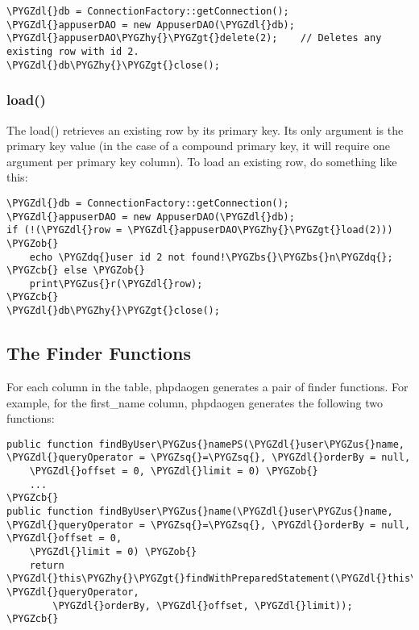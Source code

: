 \documentclass[letterpaper,10pt,english]{sphinxmanual}
\def\PYGZbs{\char`\\}
\def\PYGZus{\char`\_}
\def\PYGZob{\char`\{}
\def\PYGZcb{\char`\}}
\def\PYGZgt{\char`\>}
\def\PYGZdl{\char`\$}
\def\PYGZhy{\char`\-}
\def\PYGZsq{\char`\'}
\def\PYGZdq{\char`\"}
\renewcommand\PYGZsq{\textquotesingle}
\begin{document}
\begin{Verbatim}[commandchars=\\\{\}]
\PYGZdl{}db = ConnectionFactory::getConnection();
\PYGZdl{}appuserDAO = new AppuserDAO(\PYGZdl{}db);
\PYGZdl{}appuserDAO\PYGZhy{}\PYGZgt{}delete(2);    // Deletes any existing row with id 2.
\PYGZdl{}db\PYGZhy{}\PYGZgt{}close();
\end{Verbatim}


\subsubsection{load()}
\label{jaxFrameworkGuide:load}
The load() retrieves an existing row by its primary key.  Its only argument is the primary key value
(in the case of a compound primary key, it will require one argument per primary key column).
To load an existing row, do something like this:

\begin{Verbatim}[commandchars=\\\{\}]
\PYGZdl{}db = ConnectionFactory::getConnection();
\PYGZdl{}appuserDAO = new AppuserDAO(\PYGZdl{}db);
if (!(\PYGZdl{}row = \PYGZdl{}appuserDAO\PYGZhy{}\PYGZgt{}load(2))) \PYGZob{}
    echo \PYGZdq{}user id 2 not found!\PYGZbs{}\PYGZbs{}n\PYGZdq{};
\PYGZcb{} else \PYGZob{}
    print\PYGZus{}r(\PYGZdl{}row);
\PYGZcb{}
\PYGZdl{}db\PYGZhy{}\PYGZgt{}close();
\end{Verbatim}


\subsection{The Finder Functions}
\label{jaxFrameworkGuide:the-finder-functions}
For each column in the table, phpdaogen generates a pair of finder functions.  For example, for the
first\_name column, phpdaogen generates the following two functions:

\begin{Verbatim}[commandchars=\\\{\}]
public function findByUser\PYGZus{}namePS(\PYGZdl{}user\PYGZus{}name, \PYGZdl{}queryOperator = \PYGZsq{}=\PYGZsq{}, \PYGZdl{}orderBy = null,
    \PYGZdl{}offset = 0, \PYGZdl{}limit = 0) \PYGZob{}
    ...
\PYGZcb{}
public function findByUser\PYGZus{}name(\PYGZdl{}user\PYGZus{}name, \PYGZdl{}queryOperator = \PYGZsq{}=\PYGZsq{}, \PYGZdl{}orderBy = null, \PYGZdl{}offset = 0,
    \PYGZdl{}limit = 0) \PYGZob{}
    return \PYGZdl{}this\PYGZhy{}\PYGZgt{}findWithPreparedStatement(\PYGZdl{}this\PYGZhy{}\PYGZgt{}findByUser\PYGZus{}namePS(\PYGZdl{}user\PYGZus{}name, \PYGZdl{}queryOperator,
        \PYGZdl{}orderBy, \PYGZdl{}offset, \PYGZdl{}limit));
\PYGZcb{}
\end{Verbatim}
\end{document}
